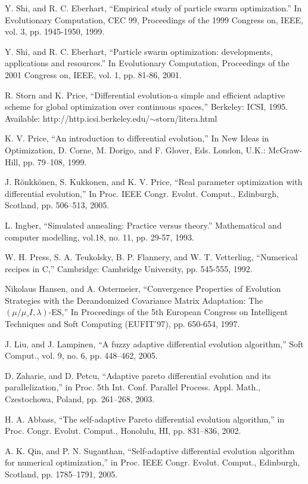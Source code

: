 \documentclass[12pt,a4paper]{article}
\theoremstyle{definition}
\theoremstyle{theorem}
\theoremstyle{definition}
\begin{document}
\begin{thebibliography}{99}
\begin{LTRitems}
Y. Shi, and R. C. Eberhart, “Empirical study of particle swarm optimization.” In Evolutionary Computation, CEC 99, Proceedings of the 1999 Congress on, IEEE, vol. 3, pp. 1945-1950, 1999.

Y. Shi, and R. C. Eberhart, “Particle swarm optimization: developments, applications and resources.” In Evolutionary Computation, Proceedings of the 2001 Congress on, IEEE, vol. 1, pp. 81-86, 2001.

R. Storn and K. Price, “Differential evolution-a simple and efficient adaptive scheme for global optimization over continuous spaces,” Berkeley: ICSI, 1995. Available: http://http.icsi.berkeley.edu/$\sim$storn/litera.html

K. V. Price, “An introduction to differential evolution,” In New Ideas in Optimization, D. Corne, M. Dorigo, and F. Glover, Eds. London, U.K.: McGraw-Hill, pp. 79–108, 1999.

J. Rönkkönen, S. Kukkonen, and K. V. Price, “Real parameter optimization with differential evolution,” In Proc. IEEE Congr. Evolut. Comput., Edinburgh, Scotland, pp. 506–513, 2005.

L. Ingber, “Simulated annealing: Practice versus theory.” Mathematical and computer modelling, vol.18, no. 11, pp. 29-57, 1993.


W. H. Press,  S. A. Teukolsky, B. P. Flannery, and W. T. Vetterling, “Numerical recipes in C,” Cambridge: Cambridge University, pp. 545-555, 1992.

Nikolaus Hansen, and A. Ostermeier, “Convergence Properties of Evolution Strategies with the Derandomized Covariance Matrix Adaptation: The $(\mu/\mu\_I, \lambda)$-ES,” In Proceedings of the 5th European Congress on Intelligent Techniques and Soft Computing (EUFIT’97), pp. 650-654, 1997.

J. Liu, and J. Lampinen, “A fuzzy adaptive differential evolution algorithm,” Soft Comput., vol. 9, no. 6, pp. 448–462, 2005.

D. Zaharie, and D. Petcu, “Adaptive pareto differential evolution and its parallelization,” in Proc. 5th Int. Conf. Parallel Process. Appl. Math., Czestochowa, Poland, pp. 261–268, 2003.

H. A. Abbass, “The self-adaptive Pareto differential evolution algorithm,” in Proc. Congr. Evolut. Comput., Honolulu, HI, pp. 831–836, 2002.

A. K. Qin, and P. N. Suganthan, “Self-adaptive differential evolution algorithm for numerical optimization,” in Proc. IEEE Congr. Evolut.
Comput., Edinburgh, Scotland, pp. 1785–1791, 2005.


\end{LTRitems}
\end{thebibliography}
\end{document}
